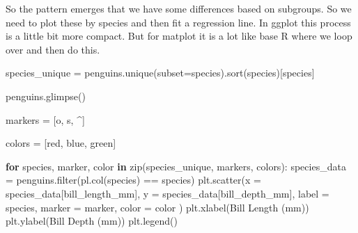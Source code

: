 \documentclass[
  letterpaper,
  DIV=11,
  numbers=noendperiod]{scrreprt}
\newenvironment{Shaded}{\begin{snugshade}}{\end{snugshade}}
\newcommand{\BuiltInTok}[1]{\textcolor[rgb]{0.00,0.23,0.31}{#1}}
\newcommand{\ControlFlowTok}[1]{\textcolor[rgb]{0.00,0.23,0.31}{\textbf{#1}}}
\newcommand{\KeywordTok}[1]{\textcolor[rgb]{0.00,0.23,0.31}{\textbf{#1}}}
\newcommand{\NormalTok}[1]{\textcolor[rgb]{0.00,0.23,0.31}{#1}}
\newcommand{\OperatorTok}[1]{\textcolor[rgb]{0.37,0.37,0.37}{#1}}
\newcommand{\StringTok}[1]{\textcolor[rgb]{0.13,0.47,0.30}{#1}}
\begin{document}
So the pattern emerges that we have some differences based on subgroups.
So we need to plot these by species and then fit a regression line. In
ggplot this process is a little bit more compact. But for matplot it is
a lot like base R where we loop over and then do this.

\begin{Shaded}
\begin{Highlighting}[]
\NormalTok{species\_unique }\OperatorTok{=}\NormalTok{ penguins.unique(subset}\OperatorTok{=}\StringTok{\textquotesingle{}species\textquotesingle{}}\NormalTok{).sort(}\StringTok{\textquotesingle{}species\textquotesingle{}}\NormalTok{)[}\StringTok{\textquotesingle{}species\textquotesingle{}}\NormalTok{]}

\NormalTok{penguins.glimpse()}

\NormalTok{markers }\OperatorTok{=}\NormalTok{ [}\StringTok{\textquotesingle{}o\textquotesingle{}}\NormalTok{, }\StringTok{\textquotesingle{}s\textquotesingle{}}\NormalTok{, }\StringTok{\textquotesingle{}\^{}\textquotesingle{}}\NormalTok{]}

\NormalTok{colors }\OperatorTok{=}\NormalTok{ [}\StringTok{\textquotesingle{}red\textquotesingle{}}\NormalTok{, }\StringTok{\textquotesingle{}blue\textquotesingle{}}\NormalTok{, }\StringTok{\textquotesingle{}green\textquotesingle{}}\NormalTok{]}

\ControlFlowTok{for}\NormalTok{ species, marker, color }\KeywordTok{in} \BuiltInTok{zip}\NormalTok{(species\_unique, markers, colors):}
\NormalTok{    species\_data }\OperatorTok{=}\NormalTok{ penguins.}\BuiltInTok{filter}\NormalTok{(pl.col(}\StringTok{\textquotesingle{}species\textquotesingle{}}\NormalTok{) }\OperatorTok{==}\NormalTok{ species)}
\NormalTok{    plt.scatter(x }\OperatorTok{=}\NormalTok{ species\_data[}\StringTok{\textquotesingle{}bill\_length\_mm\textquotesingle{}}\NormalTok{], y }\OperatorTok{=}\NormalTok{ species\_data[}\StringTok{\textquotesingle{}bill\_depth\_mm\textquotesingle{}}\NormalTok{],}
\NormalTok{    label }\OperatorTok{=}\NormalTok{ species, marker }\OperatorTok{=}\NormalTok{ marker, color }\OperatorTok{=}\NormalTok{ color )}
\NormalTok{    plt.xlabel(}\StringTok{\textquotesingle{}Bill Length (mm)\textquotesingle{}}\NormalTok{)}
\NormalTok{    plt.ylabel(}\StringTok{\textquotesingle{}Bill Depth (mm)\textquotesingle{}}\NormalTok{)}
\NormalTok{    plt.legend()}
\end{Highlighting}
\end{Shaded}
\end{document}
